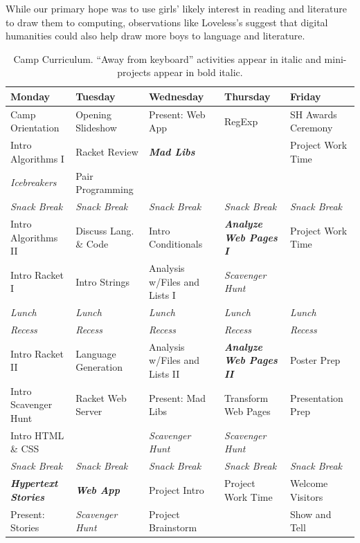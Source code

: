 While our primary hope was to use girls' likely interest in reading
and literature to draw them to computing, observations like Loveless's
suggest that digital humanities could also help draw more boys to
language and literature.


\newcommand{\afk}[1]{\textit{#1}}
\newcommand{\proj}[1]{\textit{\textbf{#1}}}

\begin{table}[t]
\begin{tabular}{|l|l|l|l|l|}
\hline
\textbf{Monday} 	& \textbf{Tuesday} 	& \textbf{Wednesday} 	& \textbf{Thursday} 		& \textbf{Friday} \\ \hline
Camp Orientation 	& Opening Slideshow 	& Present: Web App	& RegExp 			& SH Awards Ceremony \\ \hline
Intro Algorithms I	& Racket Review		& \proj{Mad Libs}	& 				& Project Work Time \\ \hline
\afk{Icebreakers}      	& Pair Programming 	& 			& 				& \\ \hline
\afk{Snack Break} & \afk{Snack Break}	& \afk{Snack Break}	& \afk{Snack Break}	& \afk{Snack Break} \\ \hline
Intro Algorithms II	& Discuss Lang. \& Code	& Intro Conditionals	& \proj{Analyze Web Pages I}	& Project Work Time \\ \hline
Intro Racket I		& Intro Strings		& Analysis w/Files and Lists I	& \afk{Scavenger Hunt}		& \\ \hline
\afk{Lunch} & \afk{Lunch}	& \afk{Lunch}	& \afk{Lunch}	& \afk{Lunch} \\ \hline
\afk{Recess} & \afk{Recess}	& \afk{Recess}	& \afk{Recess}	& \afk{Recess} \\ \hline
Intro Racket II		& Language Generation	& Analysis w/Files and Lists II	& \proj{Analyze Web Pages II} 	& Poster Prep \\ \hline
Intro Scavenger Hunt	& Racket Web Server 	& Present: Mad Libs	& Transform Web Pages		& Presentation Prep \\ \hline
Intro HTML \& CSS 	&			& \afk{Scavenger Hunt}	& \afk{Scavenger Hunt}		& \\ \hline
\afk{Snack Break} & \afk{Snack Break}	& \afk{Snack Break}	& \afk{Snack Break}	& \afk{Snack Break} \\ \hline
\proj{Hypertext Stories}& \proj{Web App}	& Project Intro 	& Project Work Time		& Welcome Visitors \\ \hline
Present: Stories 	& \afk{Scavenger Hunt}	& Project Brainstorm	& 				& Show and Tell \\ \hline
\end{tabular}
\caption{Camp Curriculum.  ``Away from keyboard'' activities appear in italic and mini-projects appear in bold italic.}
\label{table:curriculum}
\end{table}

